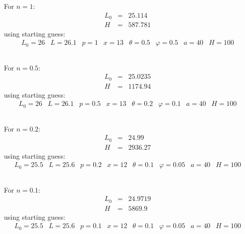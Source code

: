 \documentclass{article}
\begin{document}
\subsection{}
For $n=1$:
$$
\begin{array}{ccc}
  L_0 & = & 25.114 \\
  H & = & 587.781
\end{array}
$$
using starting guess:
$$
\begin{array}{cccccccc}
L_0 = 26 & L = 26.1 & p = 1 & x = 13 & \theta  = 0.5 & \varphi = 0.5 & a = 40 & H = 100
\end{array}
$$

\subsection{}
For $n=0.5$:
$$
\begin{array}{ccc}
  L_0 & = & 25.0235 \\
  H & = & 1174.94
\end{array}
$$
using starting guess:
$$
\begin{array}{cccccccc}
L_0 = 26 & L = 26.1 & p = 0.5 & x = 13 & \theta  = 0.2 & \varphi = 0.1 & a = 40 & H = 100
\end{array}
$$

\subsection{}
For $n=0.2$:
$$
\begin{array}{ccc}
  L_0 & = & 24.99 \\
  H & = & 2936.27
\end{array}
$$
using starting guess:
$$
\begin{array}{cccccccc}
L_0 = 25.5 & L = 25.6 & p = 0.2 & x = 12 & \theta  = 0.1 & \varphi = 0.05 & a = 40 & H = 100
\end{array}
$$

\subsection{}
For $n=0.1$:
$$
\begin{array}{ccc}
  L_0 & = & 24.9719\\
  H & = & 5869.9
\end{array}
$$
using starting guess:
$$
\begin{array}{cccccccc}
L_0 = 25.5 & L = 25.6 & p = 0.1 & x = 12 & \theta  = 0.1 & \varphi = 0.05 & a = 40 & H = 100
\end{array}
$$
\end{document}
